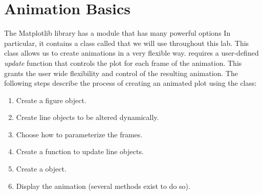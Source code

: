 \section*{Animation Basics}
The Matplotlib library has a module  that has many powerful options
In particular, it contains a class called  that we will use throughout this lab.
This class allows us to create animations in a very flexible way.
 requires a user-defined \textit{update} function that controls the plot for each frame of the animation.
This grants the user wide flexibility and control of the resulting animation.
The following steps describe the process of creating an animated plot using the  class:
\begin{enumerate}
\item Create a figure object.
\item Create line objects to be altered dynamically.
\item Choose how to parameterize the frames.
\item Create a function to update line objects.
\item Create a  object.
\item Display the animation (several methods exist to do so).
\end{enumerate}

